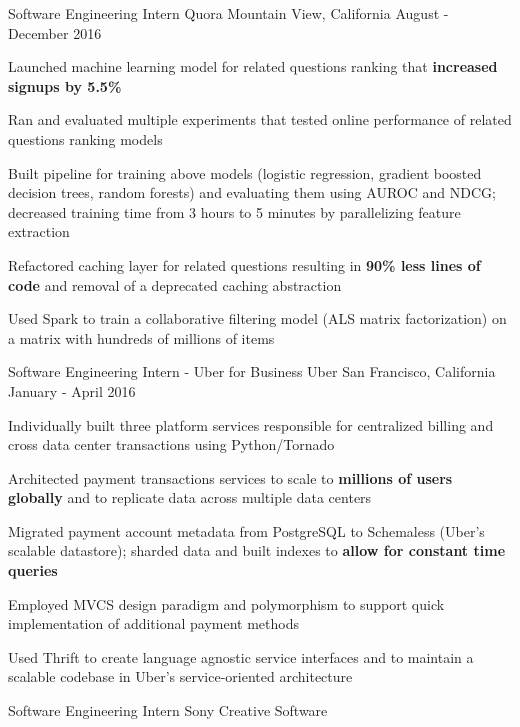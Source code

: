 \begin{cventries}
  \cventry
    {Software Engineering Intern}
    {Quora}
    {Mountain View, California}
    {August - December 2016}
    {
      \begin{cvitems}
      \item Launched machine learning model for related questions ranking that \textbf{increased signups by 5.5\%}
      \item Ran and evaluated multiple experiments that tested online performance of related questions ranking models
      \item Built pipeline for training above models (logistic regression, gradient boosted decision trees, random forests) and evaluating them using AUROC and NDCG; decreased training time from 3 hours to 5 minutes by parallelizing feature extraction
      \item Refactored caching layer for related questions resulting in \textbf{90\% less lines of code} and removal of a deprecated caching abstraction
      \item Used Spark to train a collaborative filtering model (ALS matrix factorization) on a matrix with hundreds of millions of items
      \end{cvitems}
    }
  \cventry
    {Software Engineering Intern - Uber for Business}
    {Uber}
    {San Francisco, California}
    {January - April 2016}
    {
      \begin{cvitems}
      \item Individually built three platform services responsible for centralized billing and cross data center transactions using Python/Tornado
      \item Architected payment transactions services to scale to \textbf{millions of users globally} and to replicate data across multiple data centers
      \item Migrated payment account metadata from PostgreSQL to Schemaless (Uber's scalable datastore); sharded data and built indexes to \textbf{allow for constant time queries}
      \item Employed MVCS design paradigm and polymorphism to support quick implementation of additional payment methods
      \item Used Thrift to create language agnostic service interfaces and to maintain a scalable codebase in Uber's service-oriented architecture
      \end{cvitems}
    }
  \cventry
    {Software Engineering Intern}
    {Sony Creative Software}

\end{cventries}
